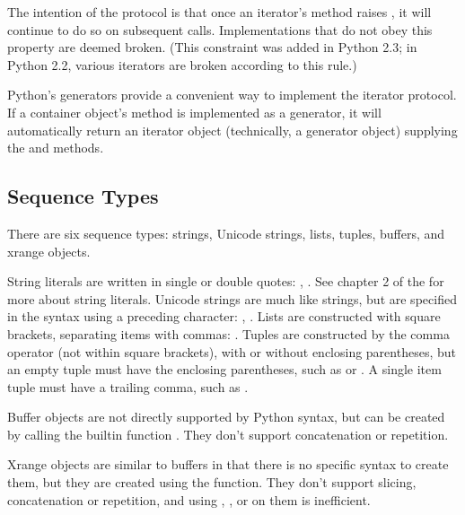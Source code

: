 The intention of the protocol is that once an iterator's
 method raises , it will
continue to do so on subsequent calls.  Implementations that
do not obey this property are deemed broken.  (This constraint
was added in Python 2.3; in Python 2.2, various iterators are
broken according to this rule.)

Python's generators provide a convenient way to implement the
iterator protocol.  If a container object's 
method is implemented as a generator, it will automatically
return an iterator object (technically, a generator object)
supplying the  and  methods.


\subsection{Sequence Types \label{typesseq}}

There are six sequence types: strings, Unicode strings, lists,
tuples, buffers, and xrange objects.

String literals are written in single or double quotes:
, .  See chapter 2 of the
 for more about
string literals.  Unicode strings are much like strings, but are
specified in the syntax using a preceding  character:
, .  Lists are constructed with square brackets,
separating items with commas: \code{[a, b, c]}.  Tuples are
constructed by the comma operator (not within square brackets), with
or without enclosing parentheses, but an empty tuple must have the
enclosing parentheses, such as  or \code{()}.  A single
item tuple must have a trailing comma, such as .

Buffer objects are not directly supported by Python syntax, but can be
created by calling the builtin function
.  They don't support
concatenation or repetition.

Xrange objects are similar to buffers in that there is no specific
syntax to create them, but they are created using the 
function.  They don't support slicing,
concatenation or repetition, and using , ,
 or  on them is inefficient.

